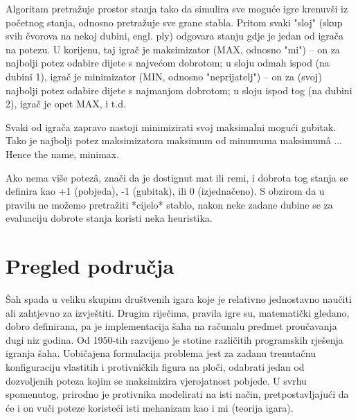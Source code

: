 \documentclass[journal]{IEEEtran}
\begin{document}
Algoritam pretražuje prostor stanja tako da simulira sve moguće igre
krenuvši iz početnog stanja, odnosno pretražuje sve grane stabla.
Pritom svaki "sloj" (skup svih čvorova na nekoj dubini, engl. ply) odgovara
stanju gdje je jedan od igrača na potezu. U korijenu, taj igrač je
maksimizator (MAX, odnosno "mi") -- on za najbolji potez odabire dijete s
najvećom dobrotom; u sloju odmah ispod (na dubini 1), igrač je minimizator
(MIN, odnosno "neprijatelj") -- on za (svoj) najbolji potez odabire dijete s
najmanjom dobrotom; u sloju ispod tog (na dubini 2), igrač je opet MAX, i t.d.

Svaki od igrača zapravo nastoji minimizirati svoj maksimalni mogući gubitak.
Tako je najbolji potez maksimizatora maksimum od minumuma maksimumâ ...
Hence the name, minimax.

Ako nema više potezâ, znači da je dostignut mat ili remi, i dobrota tog stanja
se definira kao +1 (pobjeda), -1 (gubitak), ili 0 (izjednačeno). S obzirom da
u pravilu ne možemo pretražiti *cijelo* stablo, nakon neke zadane dubine se za
evaluaciju dobrote stanja koristi neka heuristika.

\section{Pregled područja}
Šah spada u veliku skupinu društvenih igara koje je relativno jednostavno naučiti ali zahtjevno za izvještiti. Drugim riječima, pravila igre su, matematički gledano, dobro definirana, pa je implementacija šaha na računalu predmet proučavanja dugi niz godina. Od 1950-tih razvijeno je stotine različitih programskih rješenja igranja šaha. Uobičajena formulacija problema jest za zadanu trenutačnu konfiguraciju vlastitih i protivničkih figura na ploči, odabrati jedan od dozvoljenih poteza kojim se maksimizira vjerojatnost pobjede. U svrhu spomenutog, prirodno je protivnika modelirati na isti način, pretpostavljajući da će i on vuči poteze koristeći isti mehanizam kao i mi (teorija igara).
\end{document}
